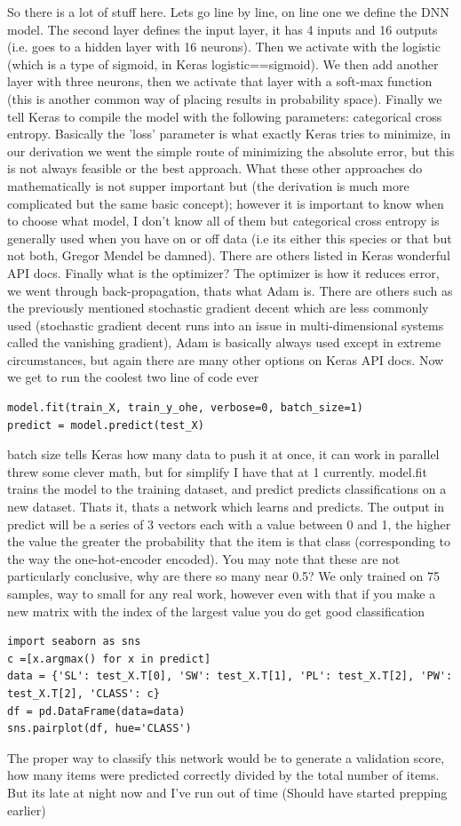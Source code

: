 \documentclass[a4paper]{article}
\begin{document}
So there is a lot of stuff here. Lets go line by line, on line one we define the DNN model. The second layer defines the input layer, it has 4 inputs and 16 outputs (i.e. goes to a hidden layer with 16 neurons). Then we activate with the logistic (which is a type of sigmoid, in Keras logistic==sigmoid). We then add another layer with three neurons, then we activate that layer with a soft-max function (this is another common way of placing results in probability space). Finally we tell Keras to compile the model with the following parameters: categorical cross entropy. Basically the 'loss' parameter is what exactly Keras tries to minimize, in our derivation we went the simple route of minimizing the absolute error, but this is not always feasible or the best approach. What these other approaches do mathematically is not supper important but (the derivation is much more complicated but the same basic concept); however it is important to know when to choose what model, I don't know all of them but categorical cross entropy is generally used when you have on or off data (i.e its either this species or that but not both, Gregor Mendel be damned). There are others listed in Keras wonderful API docs. Finally what is the optimizer? The optimizer is how it reduces error, we went through back-propagation, thats what Adam is. There are others such as the previously mentioned stochastic gradient decent which are less commonly used (stochastic gradient decent runs into an issue in multi-dimensional systems called the vanishing gradient), Adam is basically always used except in extreme circumstances, but again there are many other options on Keras API docs. Now we get to run the coolest two line of code ever
\begin{verbatim}
model.fit(train_X, train_y_ohe, verbose=0, batch_size=1)
predict = model.predict(test_X)
\end{verbatim}
batch size tells Keras how many data to push it at once, it can work in parallel threw some clever math, but for simplify I have that at 1 currently. model.fit trains the model to the training dataset, and predict predicts classifications on a new dataset. Thats it, thats a network which learns and predicts. The output in predict will be a series of 3 vectors each with a value between 0 and 1, the higher the value the greater the probability that the item is that class (corresponding to the way the one-hot-encoder encoded). You may note that these are not particularly conclusive, why are there so many near 0.5? We only trained on 75 samples, way to small for any real work, however even with that if you make a new matrix with the index of the largest value you do get good classification
\begin{verbatim}
import seaborn as sns
c =[x.argmax() for x in predict]
data = {'SL': test_X.T[0], 'SW': test_X.T[1], 'PL': test_X.T[2], 'PW': test_X.T[2], 'CLASS': c}
df = pd.DataFrame(data=data)
sns.pairplot(df, hue='CLASS')
\end{verbatim}
The proper way to classify this network would be to generate a validation score, how many items were predicted correctly divided by the total number of items. But its late at night now and I've run out of time (Should have started prepping earlier)
\end{document}
